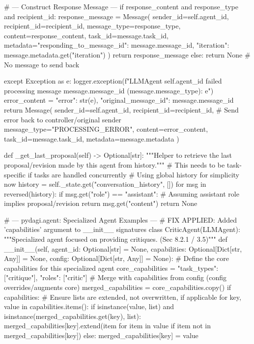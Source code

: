 \documentclass{amsbook}
\theoremstyle{definition}
\theoremstyle{remark}
\numberwithin{equation}{chapter} %
\begin{document}
\begin{python}
            # --- Construct Response Message ---
            if response_content and response_type and recipient_id:
                 response_message = Message(
                     sender_id=self.agent_id,
                     recipient_id=recipient_id,
                     message_type=response_type,
                     content=response_content,
                     task_id=message.task_id,
                     metadata={"responding_to_message_id": message.message_id, "iteration": message.metadata.get("iteration")}
                 )
                 return response_message
            else:
                 return None # No message to send back

        except Exception as e:
             logger.exception(f"LLMAgent {self.agent_id} failed processing message {message.message_id} ({message.message_type}): {e}")
             error_content = {"error": str(e), "original_message_id": message.message_id}
             return Message(
                 sender_id=self.agent_id,
                 recipient_id=recipient_id, # Send error back to controller/original sender
                 message_type="PROCESSING_ERROR",
                 content=error_content,
                 task_id=message.task_id,
                 metadata=message.metadata
             )

    def _get_last_proposal(self) -> Optional[str]:
        """Helper to retrieve the last proposal/revision made by this agent from history."""
        # This needs to be task-specific if tasks are handled concurrently
        # Using global history for simplicity now
        history = self._state.get("conversation_history", [])
        for msg in reversed(history):
            if msg.get("role") == "assistant":
                 # Assuming assistant role implies proposal/revision
                 return msg.get("content")
        return None


# --- pydagi.agent: Specialized Agent Examples ---
# FIX APPLIED: Added 'capabilities' argument to __init__ signatures
class CriticAgent(LLMAgent):
    """Specialized agent focused on providing critiques. (Sec 8.2.1 / 3.5)"""
    def __init__(self, agent_id: Optional[str] = None, capabilities: Optional[Dict[str, Any]] = None, config: Optional[Dict[str, Any]] = None):
        # Define the core capabilities for this specialized agent
        core_capabilities = {"task_types": ["critique"], "roles": ["critic"]}
        # Merge with capabilities from config (config overrides/augments core)
        merged_capabilities = core_capabilities.copy()
        if capabilities:
            # Ensure lists are extended, not overwritten, if applicable
            for key, value in capabilities.items():
                 if isinstance(value, list) and isinstance(merged_capabilities.get(key), list):
                      merged_capabilities[key].extend(item for item in value if item not in merged_capabilities[key])
                 else:
                      merged_capabilities[key] = value


\end{python}
\end{document}
